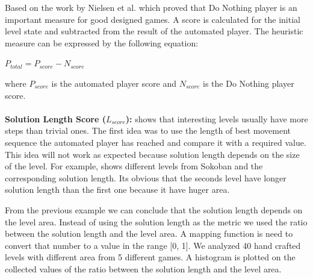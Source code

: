 Based on the work by Nielsen et al.\cite{gvgpPerformanceProfiles} which proved that Do Nothing player is an important measure for good designed games. A score is calculated for the initial level state and subtracted from the result of the automated player. The heuristic measure can be expressed by the following equation:
\begin{center}$ P_{total} = P_{score} - N_{score}$\end{center}
where $P_{score}$ is the automated player score and $N_{score}$ is the Do Nothing player score.\\\\
\textbf{Solution Length Score ($L_{score}$):}  shows that interesting levels usually have more steps than trivial ones. The first idea was to use the length of best movement sequence the automated player has reached and compare it with a required value. This idea will not work as expected because solution length depends on the size of the level. For example,  shows different levels from Sokoban and the corresponding solution length. Its obvious that the seconds level have longer solution length than the first one because it have huger area.


From the previous example we can conclude that the solution length depends on the level area. Instead of using the solution length as the metric we used the ratio between the solution length and the level area. A mapping function is need to convert that number to a value in the range [0, 1]. We analyzed 40 hand crafted levels with different area from 5 different games. A histogram is plotted on the collected values of the ratio between the solution length and the level area.


